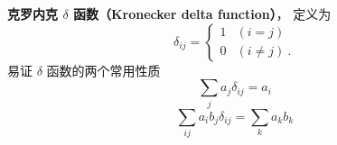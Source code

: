 
\begin{issues}
\end{issues}


\textbf{克罗内克 $\delta$ 函数（Kronecker delta function）}， 定义为
\begin{equation}\label{Kronec_eq2}
\delta_{ij} =
\begin{cases}
1 & (i = j)\\
0 & (i \ne j)~.
\end{cases}
\end{equation}
易证 $\delta$ 函数的两个常用性质
\begin{equation}\label{Kronec_eq1}
\sum_j a_j \delta_{ij} = a_i
\end{equation}
\begin{equation}
\sum_{ij} a_i b_j \delta_{ij} = \sum_k a_k b_k
\end{equation}
